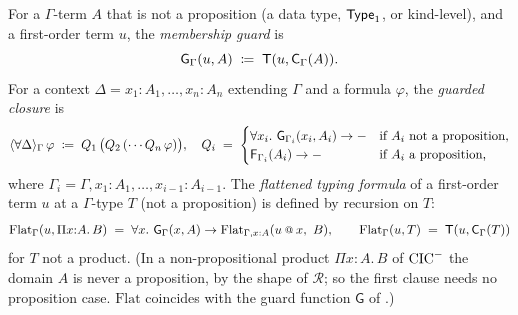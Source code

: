\begin{definition}[Guards]
\label{def:guards}
For a $\Gamma$-term $A$ that is not a proposition (a data type,
$\mathsf{Type}_1$, or kind-level), and a first-order term $u$, the
\emph{membership guard} is
\[
  \mathsf{G}_{\Gamma}(u,A) \;\coloneqq\; \mathsf{T}(u, \mathsf{C}_{\Gamma}(A)) .
\]
For a context $\Delta = x_1{:}A_1, \ldots, x_n{:}A_n$ extending
$\Gamma$ and a formula $\varphi$, the \emph{guarded closure} is
\[
  \langle \forall \Delta \rangle_{\Gamma}\, \varphi \;\coloneqq\;
  Q_1\, \bigl( Q_2\, ( \cdots Q_n\, \varphi ) \bigr),
  \quad
  Q_i \;=\;
  \begin{cases}
    \forall x_i.\ \mathsf{G}_{\Gamma_i}(x_i,A_i) \to {-} & \text{if $A_i$ not a proposition,}\\
    \mathsf{F}_{\Gamma_i}(A_i) \to {-} & \text{if $A_i$ a proposition,}
  \end{cases}
\]
where $\Gamma_i = \Gamma, x_1{:}A_1, \ldots, x_{i-1}{:}A_{i-1}$.
The \emph{flattened typing formula} of a first-order term $u$ at a
$\Gamma$-type $T$ (not a proposition) is defined by recursion on
$T$:
\[
  \mathrm{Flat}_\Gamma(u, \Pi x{:}A.\,B) \;=\;
     \forall x.\ \trG{\Gamma}{x}{A} \to \mathrm{Flat}_{\Gamma, x:A}(u \app x,\ B),
  \qquad
  \mathrm{Flat}_\Gamma(u, T) \;=\; \hastype(u, \trC{\Gamma}{T})
\]
for $T$ not a product.  (In a non-propositional product
$\Pi x{:}A.\,B$ of $\mathrm{CIC}^{-}$ the domain $A$ is never a proposition,
by the shape of $\mathcal{R}$; so the first clause needs no
proposition case.  $\mathrm{Flat}$ coincides with the guard function
$\mathsf{G}$ of \cite[\S5.2]{CzajkaKaliszyk2018}.)
\end{definition}

